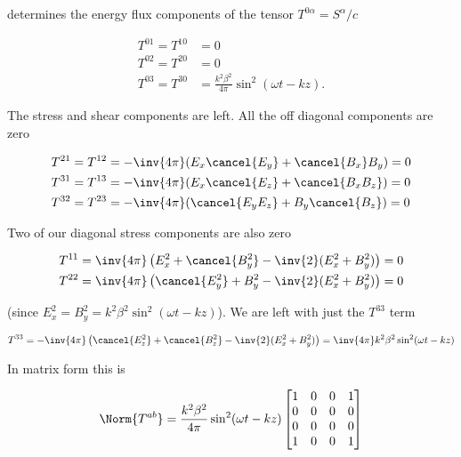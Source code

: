 determines the energy flux components of the tensor $T^{0 \alpha} = S^\alpha/c$

\begin{align}\label{eqn:relativisticElectrodynamicsPS6P1:n}
T^{0 1} = T^{1 0} &= 0 \\
T^{0 2} = T^{2 0} &= 0 \\
T^{0 3} = T^{3 0} &= \frac{k^2 \beta^2}{4 \pi} \sin^2(\omega t - k z).
\end{align}

The stress and shear components are left.  All the off diagonal components are zero

\begin{align}\label{eqn:relativisticElectrodynamicsPS6P1:n}
T^{2 1} = T^{1 2} &= - \inv{4 \pi} ( E_x \cancel{E_y} + \cancel{B_x} B_y ) = 0 \\
T^{3 1} = T^{1 3} &= - \inv{4 \pi} ( E_x \cancel{E_z} + \cancel{B_x B_z} ) = 0 \\
T^{3 2} = T^{2 3} &= - \inv{4 \pi} ( \cancel{E_y E_z} + B_y \cancel{B_z} ) = 0
\end{align}

Two of our diagonal stress components are also zero

\begin{align}\label{eqn:relativisticElectrodynamicsPS6P1:n}
T^{1 1} &= \inv{4 \pi} \left( E_x^2 + \cancel{B_y^2} - \inv{2} (E_x^2 + B_y^2) \right) = 0 \\
T^{2 2} &= \inv{4 \pi} \left( \cancel{E_y^2} + B_y^2 - \inv{2} (E_x^2 + B_y^2) \right) = 0
\end{align}

(since $E_x^2 = B_y^2 = k^2 \beta^2 \sin^2(\omega t - k z)$).  We are left with just the $T^{3 3}$ term

\begin{equation}\label{eqn:relativisticElectrodynamicsPS6P1:n}
T^{3 3} = -\inv{4 \pi} \left( \cancel{E_z^2} + \cancel{B_z^2} - \inv{2}(E_x^2 + B_y^2) \right) = \inv{4 \pi} k^2 \beta^2 \sin^2(\omega t - k z)
\end{equation}

In matrix form this is

\begin{equation}\label{eqn:relativisticElectrodynamicsPS6P1:n}
\Norm{T^{a b}} = 
\frac{k^2 \beta^2}{4 \pi} \sin^2(\omega t - k z)
\begin{bmatrix}
1 & 0 & 0 & 1 \\
0 & 0 & 0 & 0 \\
0 & 0 & 0 & 0 \\
1 & 0 & 0 & 1 \\
\end{bmatrix}
\end{equation}

